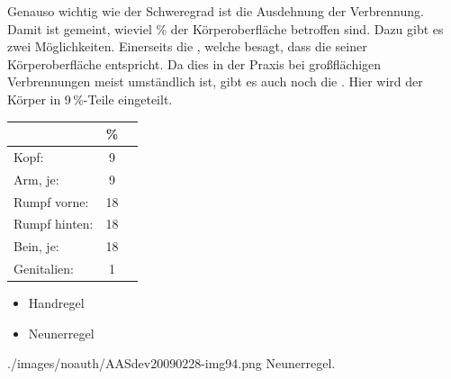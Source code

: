 {
Genauso wichtig wie der Schweregrad ist die Ausdehnung der
Verbrennung. Damit ist gemeint, wieviel \% der Körperoberfläche betroffen sind.
Dazu gibt es zwei Möglichkeiten. Einerseits die , welche
besagt, dass die 
seiner Körperoberfläche entspricht. Da dies in der Praxis
bei großflächigen Verbrennungen meist umständlich ist, gibt
es auch noch die . Hier wird der Körper in
9\,\%-Teile eingeteilt.

\begin{center}
\begin{tabulary}{\linewidth}[H]{LCC}
\toprule
 & \% &
\\\midrule
Kopf:
 & 9  &
\\
Arm, je:  &  9  &
\\
Rumpf vorne: & 18  &
\\
Rumpf hinten: & 18 &
\\
Bein, je: & 18 &
\\
Genitalien:  & 1 &
\\\bottomrule
\end{tabulary}
\end{center}
}{
\begin{itemize}
  \item Handregel
  \item Neunerregel
\end{itemize}
}
{./images/noauth/AASdev20090228-img94.png}
{Neunerregel.}{}



